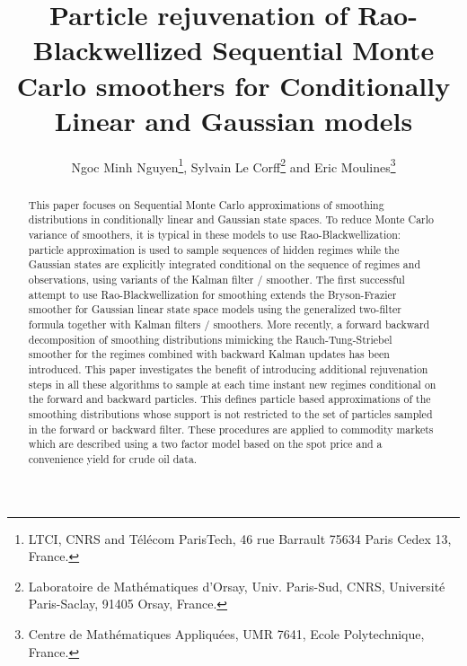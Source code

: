 \documentclass[nolayout]{article}
\theoremstyle{plain}
\theoremstyle{definition}
\newcommand{\1}{\mathbbm{1}}
\begin{document}
\title{Particle rejuvenation of Rao-Blackwellized Sequential Monte Carlo smoothers for Conditionally Linear and Gaussian models}
\date{}

\author{Ngoc Minh Nguyen\footnote{LTCI, CNRS and T\'el\'ecom ParisTech, 46 rue Barrault 75634 Paris Cedex 13, France.}, Sylvain {L}e {C}orff\footnote{Laboratoire de Math\'ematiques d'Orsay, Univ. Paris-Sud, CNRS, Universit\'e Paris-Saclay, 91405 Orsay, France.} and Eric Moulines\footnote{Centre de Math\'ematiques Appliqu\'ees, UMR 7641, Ecole Polytechnique, France.}}


\maketitle

\begin{abstract}
This paper focuses on Sequential Monte Carlo approximations of smoothing distributions in conditionally linear and Gaussian state spaces. To reduce Monte Carlo variance of smoothers, it is typical in these models to use Rao-Blackwellization: particle approximation is used to sample sequences of hidden regimes while the Gaussian states are explicitly integrated conditional on the sequence of regimes and observations, using variants of the Kalman filter / smoother. The first successful attempt to use Rao-Blackwellization for smoothing extends the Bryson-Frazier smoother for Gaussian linear state space models using the generalized two-filter formula together with Kalman filters / smoothers. More recently, a  forward backward decomposition of smoothing distributions mimicking the Rauch-Tung-Striebel smoother for the regimes combined with backward Kalman updates has been introduced.  
This paper investigates the benefit of introducing additional rejuvenation steps in all these algorithms to sample at each time instant new  regimes conditional on the forward and backward particles. This defines particle based approximations of the smoothing distributions whose support is not restricted to the set of particles sampled in the forward or backward filter. These procedures are applied to commodity markets which are described using a two factor model based on the spot price and a convenience yield for crude oil data.
\end{abstract}
\end{document}
